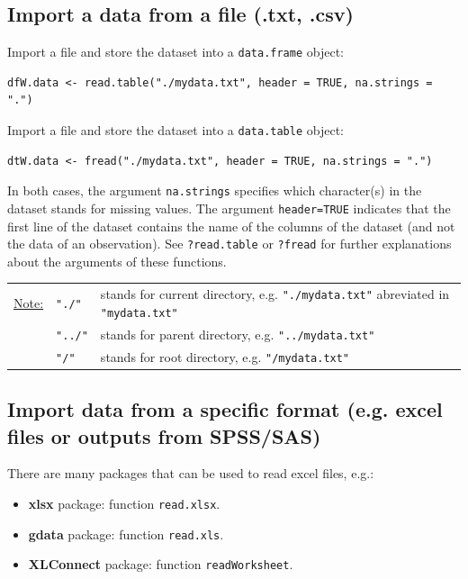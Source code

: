 \documentclass{article}
\begin{document}
\subsection{Import a data from a file (.txt, .csv)}
\label{sec:org8852b2f}

Import a file and store the dataset into a \texttt{data.frame} object:
\lstset{language=r,label= ,caption= ,captionpos=b,numbers=none}
\begin{lstlisting}
dfW.data <- read.table("./mydata.txt", header = TRUE, na.strings = ".")
\end{lstlisting}

Import a file and store the dataset into a \texttt{data.table} object:
\lstset{language=r,label= ,caption= ,captionpos=b,numbers=none}
\begin{lstlisting}
dtW.data <- fread("./mydata.txt", header = TRUE, na.strings = ".")
\end{lstlisting}

In both cases, the argument \texttt{na.strings} specifies which character(s)
in the dataset stands for missing values. The argument \texttt{header=TRUE}
indicates that the first line of the dataset contains the name of the
columns of the dataset (and not the data of an observation). See
\texttt{?read.table} or \texttt{?fread} for further explanations about the arguments
of these functions.

\bigskip

\begin{center}
\begin{tabular}{lll}
\uline{Note:} & \texttt{"./"} & stands for current directory, e.g. \texttt{"./mydata.txt"} abreviated in \texttt{"mydata.txt"}\\
 & \texttt{"../"} & stands for parent directory, e.g. \texttt{"../mydata.txt"}\\
 & \texttt{"/"} & stands for root directory, e.g. \texttt{"/mydata.txt"}\\
\end{tabular}
\end{center}

\subsection{Import data from a specific format (e.g. excel files or outputs from SPSS/SAS)}
\label{sec:orgc8691be}

There are many packages that can be used to read excel files, e.g.:
\begin{itemize}
\item \textbf{xlsx} package: function \texttt{read.xlsx}.
\item \textbf{gdata} package: function \texttt{read.xls}.
\item \textbf{XLConnect} package: function \texttt{readWorksheet}.
\end{itemize}
\end{document}
